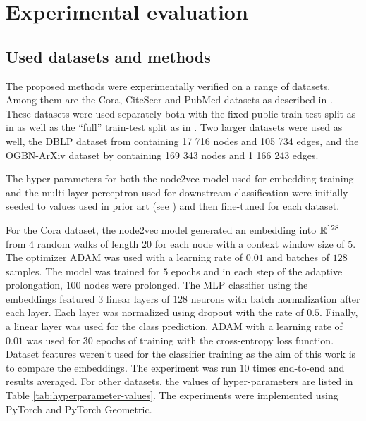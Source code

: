 \section{Experimental evaluation}

\subsection{Used datasets and methods}

The proposed methods were experimentally verified on a range of datasets. Among them are the Cora, CiteSeer and PubMed datasets as described in \cite{yang_revisiting_2016}. These datasets were used separately both with the fixed public train-test split as in \cite{yang_revisiting_2016} as well as the \enquote{full} train-test split as in \cite{chen_fastgcn_2018}. Two larger datasets were used as well, the DBLP dataset from \cite{bojchevski_deep_2018} containing 17 716 nodes and 105 734 edges, and the OGBN-ArXiv dataset by \cite{hu_open_2021} containing 169 343 nodes and 1 166 243 edges.

The hyper-parameters for both the node2vec model used for embedding training and the multi-layer perceptron used for downstream classification were initially seeded to values used in prior art (see \cite{hu_open_2021}) and then fine-tuned for each dataset.

For the Cora dataset, the node2vec model generated an embedding into \( \mathbb{R}^{128} \) from \( 4 \) random walks of length \( 20 \) for each node with a context window size of \( 5 \). The optimizer ADAM \cite{kingma_adam:_2017} was used with a learning rate of \( 0.01 \) and batches of \( 128 \) samples. The model was trained for \( 5 \) epochs and in each step of the adaptive prolongation, \( 100 \) nodes were prolonged. The MLP classifier using the embeddings featured \( 3 \) linear layers of \( 128 \) neurons with batch normalization after each layer. Each layer was normalized using dropout \cite{srivastava_dropout_2014} with the rate of \( 0.5 \). Finally, a linear layer was used for the class prediction. ADAM with a learning rate of \( 0.01 \)  was used for \( 30 \) epochs of training with the cross-entropy loss function. Dataset features weren't used for the classifier training as the aim of this work is to compare the embeddings. The experiment was run \( 10 \) times end-to-end and results averaged. For other datasets, the values of hyper-parameters are listed in Table \ref{tab:hyperparameter-values}. The experiments were implemented using PyTorch \cite{paszke_pytorch_2019} and PyTorch Geometric\cite{fey_fast_2019}.

